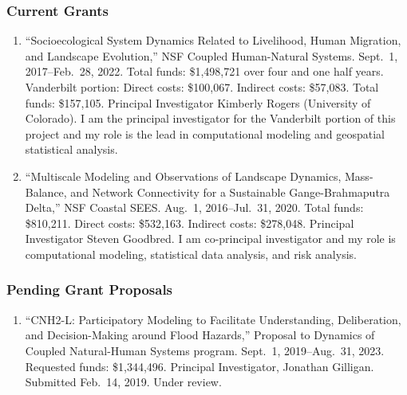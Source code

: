 %
%
\subsubsection{Current Grants}
\begin{enumerate}
    \item ``Socioecological System Dynamics Related to Livelihood, Human Migration, and Landscape Evolution,'' NSF Coupled Human-Natural Systems. Sept.~1, 2017--Feb.~28, 2022. Total funds: \$1,498,721 over four and one half years. Vanderbilt portion: Direct costs: \$100,067. Indirect costs: \$57,083. Total funds: \$157,105. Principal Investigator Kimberly Rogers (University of Colorado). I am the principal investigator for the Vanderbilt portion of this project and my role is the lead in computational modeling and geospatial statistical analysis.
    \item ``Multiscale Modeling and Observations of Landscape Dynamics, Mass-Balance, and Network Connectivity for a Sustainable Gange-Brahmaputra Delta,'' NSF Coastal SEES. Aug.~1, 2016--Jul.~31, 2020. Total funds: \$810,211. Direct costs: \$532,163. Indirect costs: \$278,048. Principal Investigator Steven Goodbred. I am co-principal investigator and my role is computational modeling, statistical data analysis, and risk analysis.
\end{enumerate}
\subsubsection{Pending Grant Proposals}
\begin{enumerate}
    \item ``CNH2-L: Participatory Modeling to Facilitate Understanding, Deliberation, and Decision-Making around Flood Hazards,'' Proposal to Dynamics of Coupled Natural-Human Systems program. Sept.~1, 2019--Aug.~31, 2023. Requested funds: \$1,344,496. Principal Investigator, Jonathan Gilligan. Submitted Feb.~14, 2019. Under review.
\end{enumerate}
